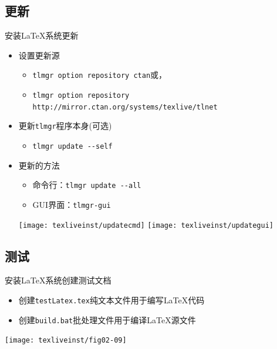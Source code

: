 \documentclass[xcolor=svgnames, t, aspectratio=169]{ctexbeamer}
\begin{document}
\subsection[更新]{更新\TeXLive }
\begin{frame}[t,fragile]{安装\LaTeX 系统}{更新\TeXLive}
  \stretchon
  \begin{itemize}
  \item 设置更新源
    \begin{itemize}
    \item \texttt{tlmgr option repository ctan}或，%
    \item \texttt{tlmgr option repository http://mirror.ctan.org/systems/texlive/tlnet}%
    \end{itemize}
  \item 更新{\verb|tlmgr|}程序本身(可选)
    \begin{itemize}
    \item {\verb|tlmgr update --self|}%
    \end{itemize}
  \item 更新\TeXLive 的方法
    \begin{itemize}
    \item 命令行：{\verb|tlmgr update --all|}%
    \item GUI界面：{\verb|tlmgr-gui|}%
    \end{itemize}
    \stretchoff
    \begin{center}
      \texttt{[image: texliveinst/updatecmd]}\quad
      \texttt{[image: texliveinst/updategui]}
    \end{center}
  \end{itemize}
\end{frame}

\subsection[测试]{测试\TeXLive }
\begin{frame}[t,fragile]{安装\LaTeX 系统}{创建\tex 测试文档}
  \begin{itemize}
  \item 创建\verb|testLatex.tex|纯文本文件用于编写{\LaTeX}代码
  \item 创建\verb|build.bat|批处理文件用于编译{\LaTeX}源文件
  \end{itemize}
  \begin{center}
    \texttt{[image: texliveinst/fig02-09]}
  \end{center}
\end{frame}
\end{document}

